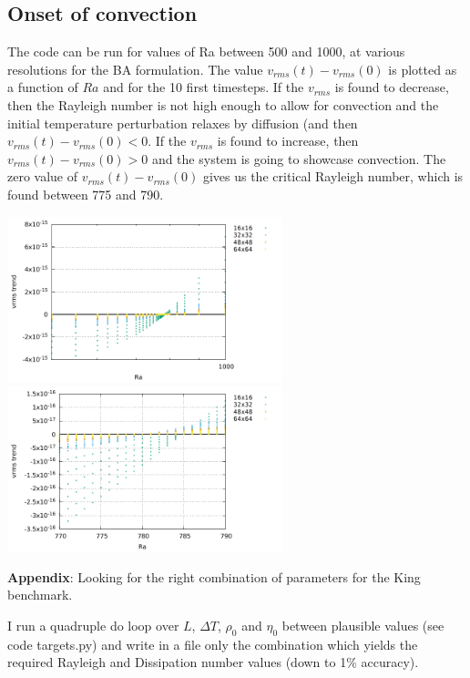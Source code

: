 \newpage
\subsection{Onset of convection}

The code can be run for values of Ra between 500 and 1000, at various resolutions for the BA formulation.
The value $v_{rms}(t)-v_{rms}(0)$ is plotted as a function of $Ra$ and for the 10 first timesteps. If the $v_{rms}$
is found to decrease, then the Rayleigh number is not high enough to allow for convection and the initial temperature
perturbation relaxes by diffusion (and then $v_{rms}(t)-v_{rms}(0)<0$. If the $v_{rms}$ is found to increase, then 
$v_{rms}(t)-v_{rms}(0)>0$ and the system is going to showcase convection. The zero value of $v_{rms}(t)-v_{rms}(0)$ 
gives us the critical Rayleigh number, which is found between 775 and 790. 


\begin{center}
\includegraphics[width=8cm]{python_codes/fieldstone_compressible2/ONSET/onset.pdf} 
\includegraphics[width=8cm]{python_codes/fieldstone_compressible2/ONSET/onset_zoom.pdf}
\end{center}

\newpage
{\bf Appendix}: Looking for the right combination of parameters for the King benchmark.

I run a quadruple do loop over $L$, $\Delta T$, $\rho_0$ and $\eta_0$ between plausible values 
(see code targets.py) and write in a file only the combination which yields the 
required Rayleigh and Dissipation number values (down to 1\% accuracy).

